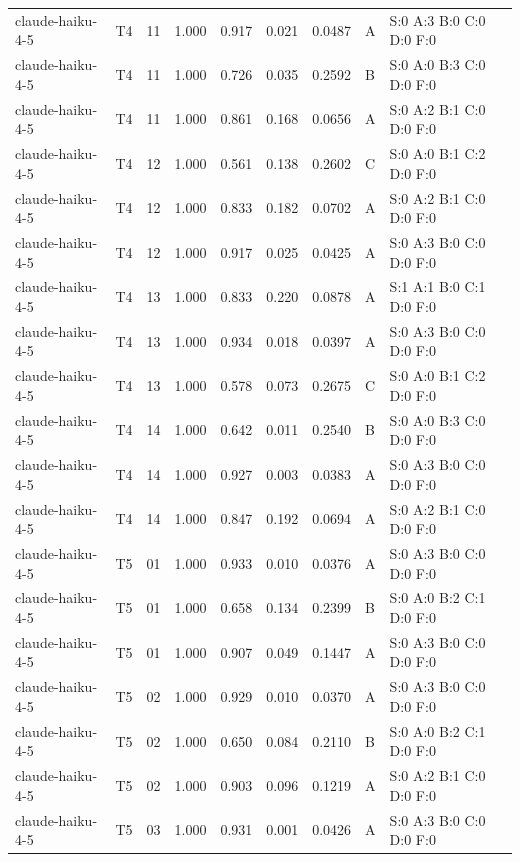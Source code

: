 \begin{longtable}{llrrrrrll}
claude-haiku-4-5 & T4 & 11 & 1.000 & 0.917 & 0.021 & 0.0487 & A & \tiny S:0 A:3 B:0 C:0 D:0 F:0 \\
claude-haiku-4-5 & T4 & 11 & 1.000 & 0.726 & 0.035 & 0.2592 & B & \tiny S:0 A:0 B:3 C:0 D:0 F:0 \\
claude-haiku-4-5 & T4 & 11 & 1.000 & 0.861 & 0.168 & 0.0656 & A & \tiny S:0 A:2 B:1 C:0 D:0 F:0 \\
claude-haiku-4-5 & T4 & 12 & 1.000 & 0.561 & 0.138 & 0.2602 & C & \tiny S:0 A:0 B:1 C:2 D:0 F:0 \\
claude-haiku-4-5 & T4 & 12 & 1.000 & 0.833 & 0.182 & 0.0702 & A & \tiny S:0 A:2 B:1 C:0 D:0 F:0 \\
claude-haiku-4-5 & T4 & 12 & 1.000 & 0.917 & 0.025 & 0.0425 & A & \tiny S:0 A:3 B:0 C:0 D:0 F:0 \\
claude-haiku-4-5 & T4 & 13 & 1.000 & 0.833 & 0.220 & 0.0878 & A & \tiny S:1 A:1 B:0 C:1 D:0 F:0 \\
claude-haiku-4-5 & T4 & 13 & 1.000 & 0.934 & 0.018 & 0.0397 & A & \tiny S:0 A:3 B:0 C:0 D:0 F:0 \\
claude-haiku-4-5 & T4 & 13 & 1.000 & 0.578 & 0.073 & 0.2675 & C & \tiny S:0 A:0 B:1 C:2 D:0 F:0 \\
claude-haiku-4-5 & T4 & 14 & 1.000 & 0.642 & 0.011 & 0.2540 & B & \tiny S:0 A:0 B:3 C:0 D:0 F:0 \\
claude-haiku-4-5 & T4 & 14 & 1.000 & 0.927 & 0.003 & 0.0383 & A & \tiny S:0 A:3 B:0 C:0 D:0 F:0 \\
claude-haiku-4-5 & T4 & 14 & 1.000 & 0.847 & 0.192 & 0.0694 & A & \tiny S:0 A:2 B:1 C:0 D:0 F:0 \\
claude-haiku-4-5 & T5 & 01 & 1.000 & 0.933 & 0.010 & 0.0376 & A & \tiny S:0 A:3 B:0 C:0 D:0 F:0 \\
claude-haiku-4-5 & T5 & 01 & 1.000 & 0.658 & 0.134 & 0.2399 & B & \tiny S:0 A:0 B:2 C:1 D:0 F:0 \\
claude-haiku-4-5 & T5 & 01 & 1.000 & 0.907 & 0.049 & 0.1447 & A & \tiny S:0 A:3 B:0 C:0 D:0 F:0 \\
claude-haiku-4-5 & T5 & 02 & 1.000 & 0.929 & 0.010 & 0.0370 & A & \tiny S:0 A:3 B:0 C:0 D:0 F:0 \\
claude-haiku-4-5 & T5 & 02 & 1.000 & 0.650 & 0.084 & 0.2110 & B & \tiny S:0 A:0 B:2 C:1 D:0 F:0 \\
claude-haiku-4-5 & T5 & 02 & 1.000 & 0.903 & 0.096 & 0.1219 & A & \tiny S:0 A:2 B:1 C:0 D:0 F:0 \\
claude-haiku-4-5 & T5 & 03 & 1.000 & 0.931 & 0.001 & 0.0426 & A & \tiny S:0 A:3 B:0 C:0 D:0 F:0 \\

\end{longtable}
